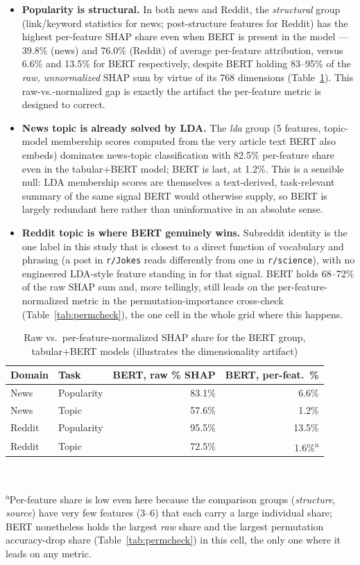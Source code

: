 \documentclass[conference]{IEEEtran}
\begin{document}
\begin{itemize}
    \item \textbf{Popularity is structural.} In both news and Reddit, the \emph{structural} group (link/keyword statistics for news; post-structure features for Reddit) has the highest per-feature SHAP share even when BERT is present in the model --- 39.8\% (news) and 76.0\% (Reddit) of average per-feature attribution, versus 6.6\% and 13.5\% for BERT respectively, despite BERT holding 83--95\% of the \emph{raw, unnormalized} SHAP sum by virtue of its 768 dimensions (Table~\ref{tab:rawvsnorm}). This raw-vs.-normalized gap is exactly the artifact the per-feature metric is designed to correct.
    \item \textbf{News topic is already solved by LDA.} The \emph{lda} group (5 features, topic-model membership scores computed from the very article text BERT also embeds) dominates news-topic classification with 82.5\% per-feature share even in the tabular+BERT model; BERT is last, at 1.2\%. This is a sensible null: LDA membership scores are themselves a text-derived, task-relevant summary of the same signal BERT would otherwise supply, so BERT is largely redundant here rather than uninformative in an absolute sense.
    \item \textbf{Reddit topic is where BERT genuinely wins.} Subreddit identity is the one label in this study that is closest to a direct function of vocabulary and phrasing (a post in \texttt{r/Jokes} reads differently from one in \texttt{r/science}), with no engineered LDA-style feature standing in for that signal. BERT holds 68--72\% of the raw SHAP sum and, more tellingly, still leads on the per-feature-normalized metric in the permutation-importance cross-check (Table~\ref{tab:permcheck}), the one cell in the whole grid where this happens.
\end{itemize}

\begin{table}[t]
\centering
\caption{Raw vs.\ per-feature-normalized SHAP share for the BERT group, tabular+BERT models (illustrates the dimensionality artifact)}
\label{tab:rawvsnorm}
\footnotesize
\begin{tabular}{@{}llrr@{}}
\toprule
\textbf{Domain} & \textbf{Task} & \textbf{BERT, raw \% SHAP} & \textbf{BERT, per-feat.\ \%} \\
\midrule
News   & Popularity & 83.1\% & 6.6\% \\
News   & Topic      & 57.6\% & 1.2\% \\
Reddit & Popularity & 95.5\% & 13.5\% \\
Reddit & Topic      & 72.5\% & 1.6\%\textsuperscript{a} \\
\bottomrule
\end{tabular}
\\[2pt]
\raggedright\footnotesize\textsuperscript{a}Per-feature share is low even here because the comparison groups (\emph{structure}, \emph{source}) have very few features (3--6) that each carry a large individual share; BERT nonetheless holds the largest \emph{raw} share and the largest permutation accuracy-drop share (Table~\ref{tab:permcheck}) in this cell, the only one where it leads on any metric.
\end{table}
\end{document}
